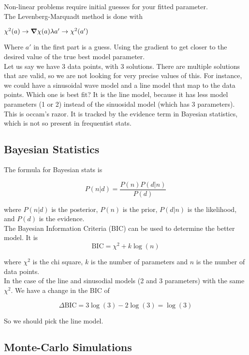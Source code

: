 \documentclass[]{article}
\begin{document}
Non-linear problems require initial guesses for your fitted parameter.\\

The Levenberg-Marquadt method is done with

$\chi^2(a) \to \grad{\chi(a)} \lambda a' \to \chi^2(a')$

Where $a'$ in the first part is a guess. Using the gradient to get closer to the desired value of the true best model parameter. \\

Let us say we have 3 data points, with 3 solutions. There are multiple solutions that are valid, so we are not looking for very precise values of this. For instance, we could have a sinusoidal wave model and a line model that map to the data points. Which one is best fit? It is the line model, because it has less model parameters (1 or 2) instead of the sinuosidal model (which has 3 parameters). This is occam's razor. It is tracked by the evidence term in Bayesian statistics, which is not so present in frequentist stats. \\

\subsection{Bayesian Statistics}\bigbreak

The formula for Bayesian stats is 

\[ P(n|d) = \frac{P(n) P(d|n)}{P(d)} \]

where $P(n|d)$ is the posterior, $P(n)$ is the prior, $P(d|n)$ is the likelihood, and $P(d)$ is the evidence.\\

The Bayesian Information Criteria (BIC) can be used to determine the better model. It is\\

\[\text{BIC} = \chi^2 + k\log(n)\]

where $\chi^2$ is the chi square, $k$ is the number of parameters and $n$ is the number of data points.\\

In the case of the line and sinusodial models (2 and 3 parameters) with the same $\chi^2$. We have a change in the BIC of 

\[\Delta \text{BIC} = 3\log(3)  - 2\log(3) = \log(3)\]

So we should pick the line model.\\


\subsection{Monte-Carlo Simulations}\bigbreak
\end{document}

